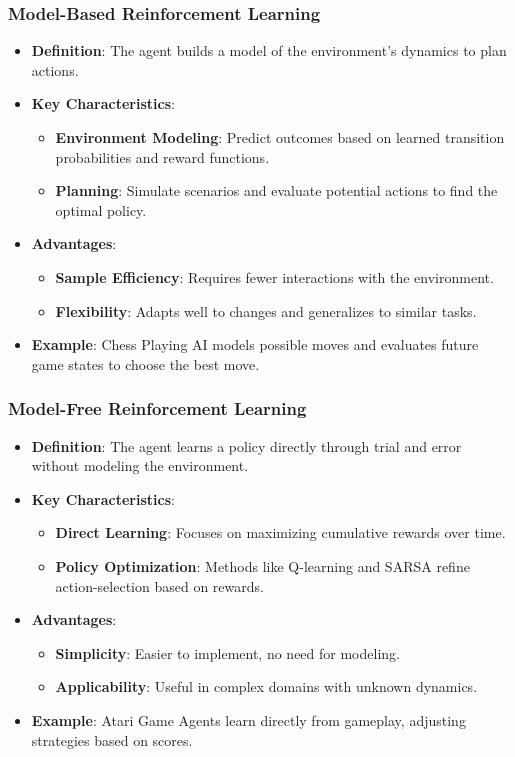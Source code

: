 \documentclass[aspectratio=169]{beamer}
\begin{document}
\begin{frame}[fragile]
    \frametitle{Model-Based Reinforcement Learning}
    \begin{itemize}
        \item \textbf{Definition}: The agent builds a model of the environment’s dynamics to plan actions.
        \item \textbf{Key Characteristics}:
        \begin{itemize}
            \item \textbf{Environment Modeling}: Predict outcomes based on learned transition probabilities and reward functions.
            \item \textbf{Planning}: Simulate scenarios and evaluate potential actions to find the optimal policy.
        \end{itemize}
        \item \textbf{Advantages}:
        \begin{itemize}
            \item \textbf{Sample Efficiency}: Requires fewer interactions with the environment.
            \item \textbf{Flexibility}: Adapts well to changes and generalizes to similar tasks.
        \end{itemize}
        \item \textbf{Example}: Chess Playing AI models possible moves and evaluates future game states to choose the best move.
    \end{itemize}
\end{frame}

\begin{frame}[fragile]
    \frametitle{Model-Free Reinforcement Learning}
    \begin{itemize}
        \item \textbf{Definition}: The agent learns a policy directly through trial and error without modeling the environment.
        \item \textbf{Key Characteristics}:
        \begin{itemize}
            \item \textbf{Direct Learning}: Focuses on maximizing cumulative rewards over time.
            \item \textbf{Policy Optimization}: Methods like Q-learning and SARSA refine action-selection based on rewards.
        \end{itemize}
        \item \textbf{Advantages}:
        \begin{itemize}
            \item \textbf{Simplicity}: Easier to implement, no need for modeling.
            \item \textbf{Applicability}: Useful in complex domains with unknown dynamics.
        \end{itemize}
        \item \textbf{Example}: Atari Game Agents learn directly from gameplay, adjusting strategies based on scores.
    \end{itemize}
\end{frame}
\end{document}
